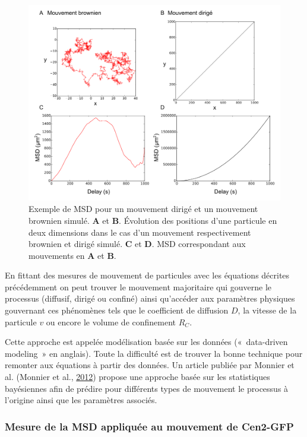 \documentclass[12pt,a4paper,twoside,openright]{book}
\begin{document}
\begin{figure}[htbp]
\centering
\includegraphics{figures/results/imaging/motions.png}
\caption[Exemple de MSD pour un mouvement dirigé et un mouvement brownien simulé]{\label{fig:motions}Exemple
de MSD pour un mouvement dirigé et un mouvement brownien simulé.
\textbf{A} et \textbf{B}. Évolution des positions d'une particule en
deux dimensions dans le cas d'un mouvement respectivement brownien et
dirigé simulé. \textbf{C} et \textbf{D}. MSD correspondant aux
mouvements en \textbf{A} et \textbf{B}.}
\end{figure}

En fittant des mesures de mouvement de particules avec les équations
décrites précédemment on peut trouver le mouvement majoritaire qui
gouverne le processus (diffusif, dirigé ou confiné) ainsi qu'accéder aux
paramètres physiques gouvernant ces phénomènes tels que le coefficient
de diffusion \(D\), la vitesse de la particule \(v\) ou encore le volume
de confinement \(R_C\).

Cette approche est appelée modélisation basée sur les données
(«~data-driven modeling~» en anglais). Toute la difficulté est de
trouver la bonne technique pour remonter aux équations à partir des
données. Un article publiée par Monnier et al. (Monnier et al.,
\protect\hyperlink{ref-Monnier2012}{2012}) propose une approche basée
sur les statistiques bayésiennes afin de prédire pour différents types
de mouvement le processus à l'origine ainsi que les paramètres associés.

\subsubsection{Mesure de la MSD appliquée au mouvement de
Cen2-GFP}\label{mesure-de-la-msd-appliquuxe9e-au-mouvement-de-cen2-gfp}
\end{document}
